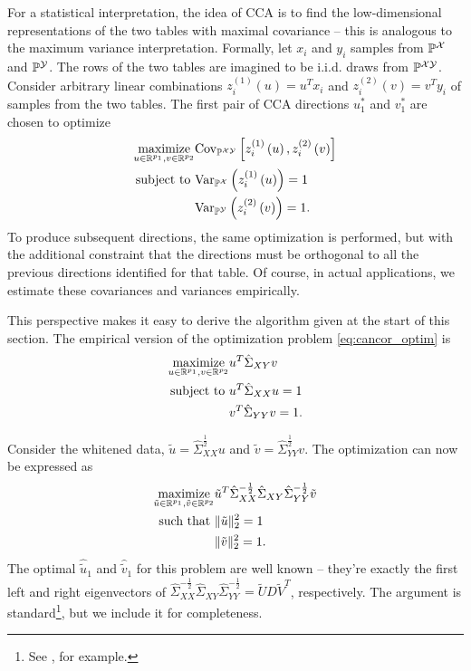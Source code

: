 \documentclass{article}
\begin{document}
For a statistical interpretation, the idea of CCA is to find the low-dimensional
representations of the two tables with maximal covariance -- this is analogous
to the maximum variance interpretation. Formally, let $x_{i}$ and $y_{i}$
samples from $\mathbb{P}^{\mathcal{X}}$ and $\mathbb{P}^{\mathcal{Y}}$. The rows of the two tables are imagined to
be i.i.d. draws from $\mathbb{P}^{\mathcal{X}\mathcal{Y}}$. Consider arbitrary linear combinations
$z_{i}^{(1)}\left(u\right) = u^{T} x_{i}$ and $z_{i}^{(2)}\left(v\right) =
v^{T}y_{i}$ of samples from the two tables. The first pair of CCA directions
$u_{1}^{\ast}$ and $v_{1}^{\ast}$ are chosen to optimize
\begin{align}
  \mathop\mathrm{maximize}_{u \in \mathbb{R}^{p_{1}}, v \in \mathbb{R}^{p_{2}}}
  &\mathrm{Cov}_{\mathbb{P}^{\mathcal{X}\mathcal{Y}}}\left[{z_{i}^{(1)}\left(u\right),
    z_{i}^{(2)}\left(v\right)}\right] \label{eq:cancor_optim} \\
\text{subject to } &\mathrm{Var}_{\mathbb{P}^{\mathcal{X}}}\left(z_{i}^{(1)}\left(u\right)\right) = 1 \\
&\mathrm{Var}_{\mathbb{P}^{\mathcal{Y}}}\left(z_{i}^{(2)}\left(v\right)\right) = 1.
\end{align}
To produce subsequent directions, the same optimization is performed, but with
the additional constraint that the directions must be orthogonal to all the
previous directions identified for that table. Of course, in actual
applications, we estimate these covariances and variances empirically.

This perspective makes it easy to derive the algorithm given at the start of
this section. The empirical version of the optimization problem
\ref{eq:cancor_optim} is
\begin{align}
  \mathop\mathrm{maximize}_{u \in \mathbb{R}^{p_{1}}, v \in \mathbb{R}^{p_{2}}}
  &u^{T}\hat{\Sigma}_{XY}v \label{eq:cancor_optim_emp}\\
  \text{subject to } & u^{T}\hat{\Sigma}_{XX}u = 1 \\
  & v^{T}\hat{\Sigma}_{YY}v = 1.
\end{align}

Consider the whitened data, $\tilde{u} = \hat{\Sigma}_{XX}^{\frac{1}{2}}u$ and
$\tilde{v} = \hat{\Sigma}_{YY}^{\frac{1}{2}}v$. The
optimization \label{eq:cancor_emp} can now be expressed as
\begin{align}
  \mathop\mathrm{maximize}_{\tilde{u} \in \mathbb{R}^{p_{1}}, \tilde{v} \in
    \mathbb{R}^{p_{2}}}
  &\tilde{u}^{T}\hat{\Sigma}_{XX}^{-\frac{1}{2}}\hat{\Sigma}_{XY}\hat{\Sigma}_{YY}^{-\frac{1}{2}}\tilde{v} \label{eq:cancor_trans} \\
\text{such that } & \|\tilde{u}\|^{2}_{2} = 1 \\
&\|\tilde{v}\|_{2}^{2} = 1.
\end{align}
The optimal $\hat{\tilde{u}}_1$ and $\hat{\tilde{v}}_1$ for this problem are
well known -- they're exactly the first left and right eigenvectors of
$\hat{\Sigma}_{XX}^{-\frac{1}{2}}\hat{\Sigma}_{XY}\hat{\Sigma}_{YY}^{-\frac{1}{2}}
= \tilde{U}D\tilde{V}^{T}$, respectively. The argument is standard\footnote{See
  \citep{mardka1980multivariate}, for example.}, but we include it for
completeness.
\end{document}
